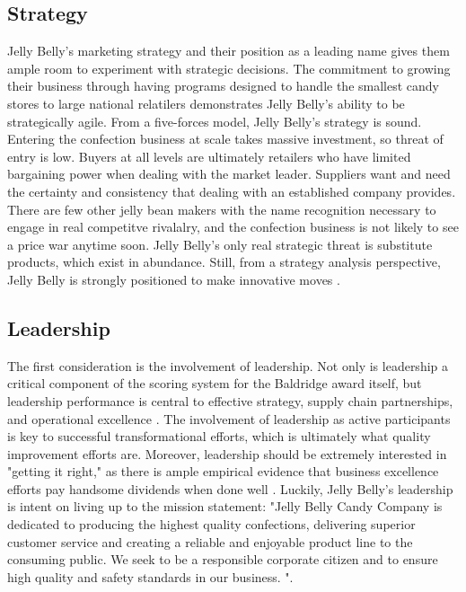 \documentclass[man]{apa7}
\begin{document}
\subsection{Strategy}
\label{sec:org02ba4a1}

Jelly Belly's marketing strategy and their position as a leading name gives them ample room to experiment with strategic decisions. The commitment to growing their business through having programs designed to handle the smallest candy stores to large national relatilers demonstrates Jelly Belly's ability to be strategically agile. From a five-forces model, Jelly Belly's strategy is sound. Entering the confection business at scale takes massive investment, so threat of entry is low. Buyers at all levels are ultimately retailers who have limited bargaining power when dealing with the market leader. Suppliers want and need the certainty and consistency that dealing with an established company provides. There are few other jelly bean makers with the name recognition necessary to engage in real competitve rivalalry, and the confection business is not likely to see a price war anytime soon. Jelly Belly's only real strategic threat is substitute products, which exist in abundance. Still, from a strategy analysis perspective, Jelly Belly is strongly positioned to make innovative moves \parencite{ Porter1979, porterDynamicTheoryStrategy1991}.

\subsection{Leadership}
\label{sec:org3f67be2}

The first consideration is the involvement of leadership. Not only is leadership a critical component of the scoring system for the Baldridge award itself, but leadership performance is central to effective strategy, supply chain partnerships, and operational excellence \parencite{Tracy2015, wangTransformationalLeadershipPerformance2011,jaenDoesIntegrityMatter2020}. The involvement of leadership as active participants is key to successful transformational efforts, which is ultimately what quality improvement efforts are. Moreover, leadership should be  extremely interested in "getting it right," as there is ample empirical evidence that business excellence efforts pay handsome dividends when done well \parencite{paranitharank.pEmpiricalValidationIntegrated2017}. Luckily, Jelly Belly's leadership is intent on living up to the mission statement: "Jelly Belly Candy Company is dedicated to producing the highest quality confections, delivering superior customer service and creating a reliable and enjoyable product line to the consuming public. We seek to be a responsible corporate citizen and to ensure high quality and safety standards in our business. \parencite{jellybellyJellyBellyMission}".
\end{document}
